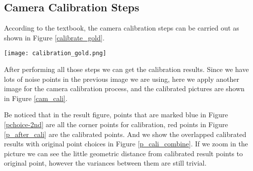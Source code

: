 \documentclass[conference]{IEEEtran}
\begin{document}
\subsection{Camera Calibration Steps}
According to the textbook, the camera calibration steps can be carried out as shown in Figure \ref{calibrate_gold}.
\begin{figure*}
  \label{calibrate_gold}
  \centering \texttt{[image: calibration\_gold.png]}
  \caption{Algorithm of Camera Calibration using Gold Standard}
\end{figure*}

After performing all those steps we can get the calibration results. Since we have lots of noise points in the previous image we are using, here we apply another image for the camera calibration process, and the calibrated pictures are shown in Figure \ref{cam_cali}.
\begin{figure*}[!hbpt]
  \caption{Camera Calibration Results}
  \label{cam_cali} %
\end{figure*}

Be noticed that in the result figure, points that are marked blue in Figure \ref{pchoice-2nd} are all the corner points for calibration, red points in Figure \ref{p_after_cali} are the calibrated points. And we show the overlapped calibrated results with original point choices in Figure \ref{p_cali_combine}. If we zoom in the picture we can see the little geometric distance from calibrated result points to original point, however the variances between them are still trivial.
\end{document}
